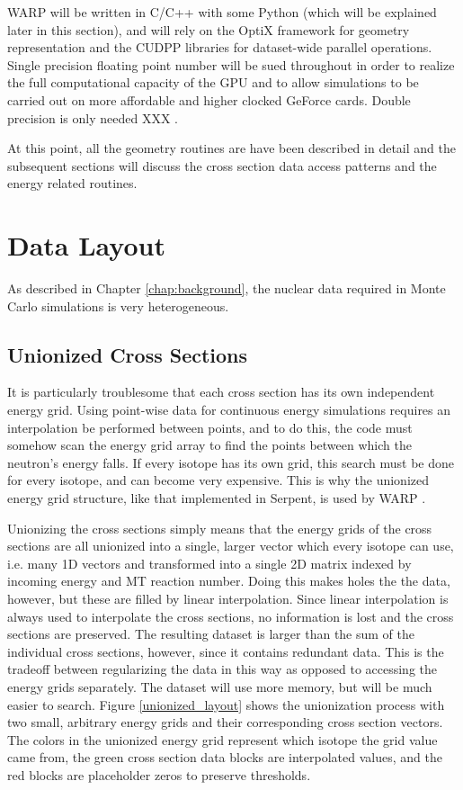 WARP will be written in C/C++ with some Python (which will be explained later in this section), and will rely on the OptiX framework for geometry representation and the CUDPP libraries for dataset-wide parallel operations. Single precision floating point number will be sued throughout in order to realize the full computational capacity of the GPU and to allow simulations to be carried out on more affordable and higher clocked GeForce cards.  Double precision is only needed XXX \cite{please}.

At this point, all the geometry routines are have been described in detail and the subsequent sections will discuss the cross section data access patterns and the energy related routines.


\section{Data Layout}

As described in Chapter \ref{chap:background}, the nuclear data required in Monte Carlo simulations is very heterogeneous.

\subsection{Unionized Cross Sections}

It is particularly troublesome that each cross section has its own independent energy grid.  Using point-wise data for continuous energy simulations requires an interpolation be performed between points, and to do this, the code must somehow scan the energy grid array to find the points between which the neutron's energy falls.  If every isotope has its own grid, this search must be done for every isotope, and can become very expensive.  This is why the unionized energy grid structure, like that implemented in Serpent, is used by WARP \cite{jaakko_xs}.

Unionizing the cross sections simply means that the energy grids of the cross sections are all unionized into a single, larger vector which every isotope can use, i.e. many 1D vectors and transformed into a single 2D matrix indexed by incoming energy and MT reaction number.  Doing this makes holes the the data, however, but these are filled by linear interpolation.  Since linear interpolation is always used to interpolate the cross sections, no information is lost and the cross sections are preserved.  The resulting dataset is larger than the sum of the individual cross sections, however, since it contains redundant data.  This is the tradeoff between regularizing the data in this way as opposed to accessing the energy grids separately.  The dataset will use more memory, but will be much easier to search.  Figure \ref{unionized_layout} shows the unionization process with two small, arbitrary energy grids and their corresponding cross section vectors.  The colors in the unionized energy grid represent which isotope the grid value came from, the green cross section data blocks are interpolated values, and the red blocks are placeholder zeros to preserve thresholds.

